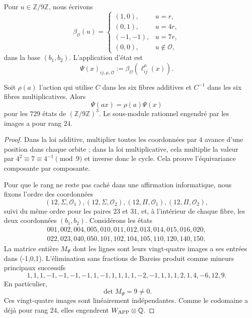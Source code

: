 Pour \(u\in\mathbb Z/9\mathbb Z\), nous écrivons
\[
 \beta_{\mathcal O}(u)=
 \begin{cases}
 (1,0),&u=r,\\
 (0,1),&u=4r,\\
 (-1,-1),&u=7r,\\
 (0,0),&u\notin\mathcal O,
 \end{cases}
\]
dans la base \((b_1,b_2)\). L’application d’état est
\[
 \Psi(x)_{ij,\mu,\mathcal O}
 :=\beta_{\mathcal O}(\ell_{ij}^{\mu}(x)).
\]

\begin{theorem}
\label{p12-83-c1-s5:thm:esqueleto-estatal-app-autonomo}
Soit \(\rho(a)\) l’action qui utilise \(C\) dans les six fibres additives et
\(C^{-1}\) dans les six fibres multiplicatives. Alors
\[
 \boxed{\Psi(ax)=\rho(a)\Psi(x)}
\]
pour les \(729\) états de \((\mathbb Z/9\mathbb Z)^3\). Le sous-module
rationnel engendré par les images a pour rang \(24\).
\end{theorem}

\begin{proof}
Dans la loi additive, multiplier toutes les coordonnées par \(4\) avance d’une
position dans chaque orbite ; dans la loi multiplicative, cela multiplie la valeur par
\(4^2\equiv7\equiv4^{-1}\pmod9\) et inverse donc le cycle. Cela prouve
l’équivariance composante par composante.

Pour que le rang ne reste pas caché dans une affirmation informatique, nous fixons
l’ordre des coordonnées
\[
 (12,\Sigma,\mathcal O_1),(12,\Sigma,\mathcal O_2),
 (12,\Pi,\mathcal O_1),(12,\Pi,\mathcal O_2),
\]
suivi du même ordre pour les paires \(23\) et \(31\), et, à l’intérieur de chaque
fibre, les deux coordonnées \((b_1,b_2)\). Considérons les états
\[
\begin{gathered}
001,002,004,005,010,011,012,013,014,015,016,020,\\
022,023,040,050,101,102,104,105,110,120,140,150.
\end{gathered}
\]
La matrice entière \(M_\Psi\) dont les lignes sont leurs vingt-quatre images a ses
entrées dans ({-1,0,1}). L’élimination sans fractions de
Bareiss produit comme mineurs principaux successifs
\[
1,1,1,-1,-1,-1,-1,1,-1,1,1,1,1,-2,-1,1,1,1,2,1,4,-6,12,9.
\]
En particulier,
\[
 \det M_\Psi=9\neq0.
\]
Ces vingt-quatre images sont linéairement indépendantes. Comme le
codomaine a déjà pour rang \(24\), elles engendrent \(W_{\rm APP}\otimes\mathbb Q\).
\end{proof}


